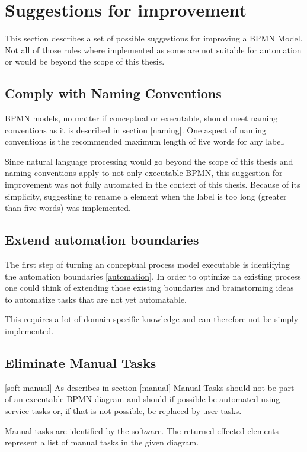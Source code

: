 \section{Suggestions for improvement}\label{last}
This section describes a set of possible suggestions for improving a BPMN Model. Not all of those rules where implemented as some are not suitable for automation or would be beyond the scope of this thesis. 

\subsection{Comply with Naming Conventions}\label{naming-con}
BPMN models, no matter if conceptual or executable, should meet naming conventions as it is described in section \ref{naming}. One aspect of naming conventions is the recommended maximum length of five words for any label. 

Since natural language processing would go beyond the scope of this thesis and naming conventions apply to not only executable BPMN, this suggestion for improvement was not fully automated in the context of this thesis. Because of its simplicity, suggesting to rename a element when the label is too long (greater than five words) was implemented.

\subsection{Extend automation boundaries}
The first step of turning an conceptual process model executable is identifying the automation boundaries \ref{automation}. In order to optimize na existing process one could think of extending those existing boundaries and brainstorming ideas to automatize tasks that are not yet automatable. 

This requires a lot of domain specific knowledge and can therefore not be simply implemented.

\subsection{Eliminate Manual Tasks}\ref{soft-manual}
As describes in section \ref{manual} Manual Tasks should not be part of an executable BPMN diagram and should if possible be automated using service tasks or, if that is not possible, be replaced by user tasks. 

Manual tasks are identified by the software. The returned effected elements represent a list of manual tasks in the given diagram.

